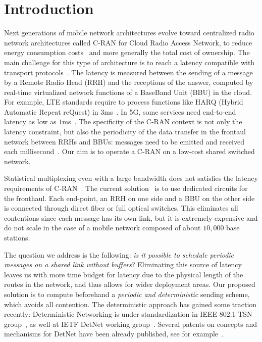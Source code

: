 \documentclass[10pt, conference, letterpaper]{IEEEtran}
\begin{document}
\section{Introduction}

Next generations of mobile network architectures evolve toward centralized radio network architectures called C-RAN for Cloud Radio Access Network, to reduce energy consumption costs~\cite{mobile2011c} and more generally the total cost of ownership. The main challenge for this type of architecture is to reach a latency compatible with transport protocols~\cite{ieeep802}. The latency is measured between the sending of a message by a Remote Radio Head (RRH) and the receptions of the answer, computed by real-time virtualized network functions of a BaseBand Unit (BBU) in the cloud. For example, LTE standards require to process functions like HARQ (Hybrid Automatic Repeat reQuest) in $3$ms~\cite{bouguen2012lte}. In 5G, some services need end-to-end latency as low as $1$ms~\cite{3gpp5g,boccardi2014five}. The specificity of the C-RAN context is not only the latency constraint, but also the periodicity of the data transfer in the frontaul network between RRHs and BBUs: messages need to be emitted and received each millisecond~\cite{bouguen2012lte}. Our aim is to operate a C-RAN on a low-cost shared switched network. 

 Statistical multiplexing even with a large bandwidth does not satisfies the latency requirements of C-RAN~\cite{dominique2018deterministic,barth2018deterministic}. The current solution~\cite{pizzinat2015things,tayq2017real} is to use dedicated circuits for the fronthaul. Each end-point, an RRH on one side and a BBU on the other side is connected through direct fiber or full optical switches. This eliminates all contentions since each message has its own link, but it is extremely expensive and do not scale in the case of a mobile network composed of about $10,000$ base stations. 

The question we address is the following: \emph{is it possible to schedule periodic messages on a shared link without buffers}? Eliminating this source of latency leaves us with more time budget for latency due to the physical length of the routes in the network, and thus allows for wider deployment areas. Our proposed solution is to compute beforehand a \emph{periodic and deterministic} sending scheme, which avoids all contention. The deterministic approach has gained some traction recently: Deterministic Networking is under standardization in IEEE 802.1 TSN group~\cite{finn-detnet-architecture-08}, as well at IETF DetNet working group~\cite{ieee802}. Several patents on concepts and mechanisms for DetNet have been already published, see for example~\cite{howe2005time,leclerc2016transmission}. 
\end{document}
